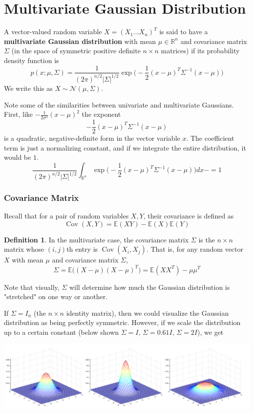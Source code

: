 \documentclass{article}
\DeclareMathOperator{\Cov}{Cov}
\theoremstyle{remark}
\theoremstyle{definition}
\newtheorem{definition}{Definition}[section]
\begin{document}
\section{Multivariate Gaussian Distribution}
A vector-valued random variable $X = (X_1 \ldots X_n)^T$ is said to have a \textbf{multivariate Gaussian distribution} with mean $\mu \in \mathbb{R}^n$ and covariance matrix $\Sigma$ (in the space of symmetric positive definite $n\times n$ matrices) if its probability density function is
\[p(x;\mu, \Sigma) = \frac{1}{(2\pi)^{n/2} |\Sigma|^{1/2}} \exp\bigg( -\frac{1}{2} (x-\mu)^T \Sigma^{-1} (x - \mu)\bigg)\]
We write this as $X \sim \mathcal{N}(\mu, \Sigma)$. 

Note some of the similarities between univariate and multivariate Gaussians. First, like $-\frac{1}{2\sigma^2} (x - \mu)^2$ the exponent
\[-\frac{1}{2} (x - \mu)^T \Sigma^{-1} (x - \mu)\] 
is a quadratic, negative-definite form in the vector variable $x$. The coefficient term is just a normalizing constant, and if we integrate the entire distribution, it would be $1$. 
\[\frac{1}{(2\pi)^{n/2} |\Sigma|^{1/2}} \int_{\mathbb{R}^n} \exp\bigg( -\frac{1}{2} (x- \mu)^T \Sigma^{-1} (x-\mu)\bigg) dx -= 1\]

\subsubsection{Covariance Matrix}
Recall that for a pair of random variables $X, Y$, their covariance is defined as
\[\Cov(X, Y) = \mathbb{E}(XY) - \mathbb{E}(X) \mathbb{E}(Y)\]

\begin{definition}
In the multivariate case, the covariance matrix $\Sigma$ is the $n \times n$ matrix whose $(i, j)$th entry is $\Cov(X_i, X_j)$. That is, for any random vector $X$ with mean $\mu$ and covariance matrix $\Sigma$, 
\[\Sigma = \mathbb{E}\big( (X - \mu) (X - \mu)^T \big) = \mathbb{E}(X X^T) - \mu \mu^T\]
\end{definition}
Note that visually, $\Sigma$ will determine how much the Gaussian distribution is "stretched" on one way or another. 

If $\Sigma = I_n$ (the $n \times n$ identity matrix), then we could visualize the Gaussian distribution as being perfectly symmetric. However, if we scale the distribution up to a certain constant (below shown $\Sigma = I$, $\Sigma = 0.61 I$, $\Sigma = 2 I$), we get
\begin{center}
    \includegraphics[scale=0.65]{img/Gaussian_Distribution.png}
\end{center}
\end{document}
